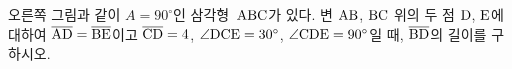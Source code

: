 \noindent\begin{minipage}[t]{0.58\linewidth}\vspace{0pt}\raggedright 오른쪽 그림과 같이 $A=90^\circ$인 삼각형~$\mathrm{ABC}$가 있다. 변 $\mathrm{AB}$, $\mathrm{BC}$ 위의 두 점 $\mathrm{D}$, $\mathrm{E}$에 대하여 $\overline{\mathrm{AD}}=\overline{\mathrm{BE}}$이고 $\overline{\mathrm{CD}}=4$, $\angle\mathrm{DCE}=30^\circ$, $\angle\mathrm{CDE}=90^\circ$일 때, $\overline{\mathrm{BD}}$의 길이를 구하시오.\end{minipage}\hfill\begin{minipage}[t]{0.4\linewidth}\vspace{0pt}\centering \resizebox{\ifdim\width>\linewidth\linewidth\else\width\fi}{!}{}\end{minipage}\par
